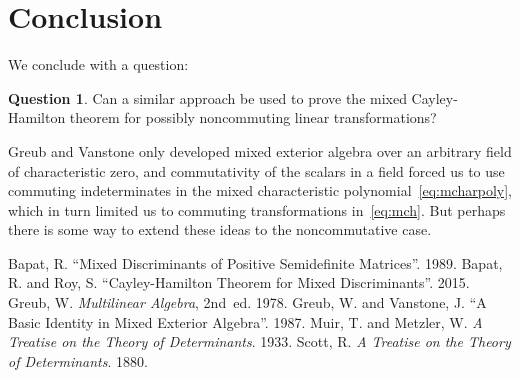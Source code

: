 \documentclass[letterpaper]{article}
\theoremstyle{definition}
\newtheorem{quest}{Question}
\theoremstyle{plain}
\begin{document}
\section*{Conclusion}
We conclude with a question:
\begin{quest}
Can a similar approach be used to prove the mixed Cayley-Hamilton theorem for possibly noncommuting linear transformations?
\end{quest}
\noindent Greub and Vanstone only developed mixed exterior algebra over an arbitrary field of characteristic zero, and commutativity of the scalars in a field forced us to use commuting indeterminates in the mixed characteristic polynomial~\eqref{eq:mcharpoly}, which in turn limited us to commuting transformations in~\eqref{eq:mch}. But perhaps there is some way to extend these ideas to the noncommutative case.

\begin{thebibliography}{0}
 Bapat, R. ``Mixed Discriminants of Positive Semidefinite Matrices''. 1989.
 Bapat, R. and Roy, S. ``Cayley-Hamilton Theorem for Mixed Discriminants''. 2015.
 Greub, W. \textit{Multilinear Algebra}, 2nd~ed. 1978.
 Greub, W. and Vanstone, J. ``A Basic Identity in Mixed Exterior Algebra''. 1987.
 Muir, T. and Metzler, W. \textit{A Treatise on the Theory of Determinants}. 1933.
 Scott, R. \textit{A Treatise on the Theory of Determinants}. 1880.
\end{thebibliography}
\end{document}

